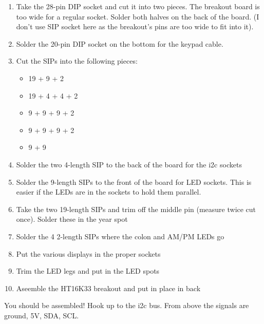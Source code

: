 \documentclass[11pt]{article}
\begin{document}
\begin{enumerate}
\item Take the 28-pin DIP socket and cut it into two pieces.
      The breakout board is too wide for a regular socket.
      Solder both halves on the back of the board.
      (I don't use SIP socket here as the breakout's pins are too
       wide to fit into it).
\item Solder the 20-pin DIP socket on the bottom for the
      keypad cable.
\item Cut the SIPs into the following pieces:
\begin{itemize}
\item 19 + 9 + 2
\item 19 + 4 + 4 + 2
\item 9 + 9 + 9 + 2
\item 9 + 9 + 9 + 2
\item 9 + 9
\end{itemize}
\item Solder the two 4-length SIP to the back of the board
      for the i2c sockets
\item Solder the 9-length SIPs to the front of the board for LED
      sockets.  This is easier if the LEDs are in the sockets to
      hold them parallel.
\item Take the two 19-length SIPs and trim off the middle pin
      (measure twice cut once).  Solder these in the year spot
\item Solder the 4 2-length SIPs where the colon and AM/PM LEDs go
\item Put the various displays in the proper sockets
\item Trim the LED legs and put in the LED spots
\item Aseemble the HT16K33 breakout and put in place in back
\end{enumerate}

You should be assembled!  Hook up to the i2c bus.  From above
the signals are ground, 5V, SDA, SCL.
\end{document}
